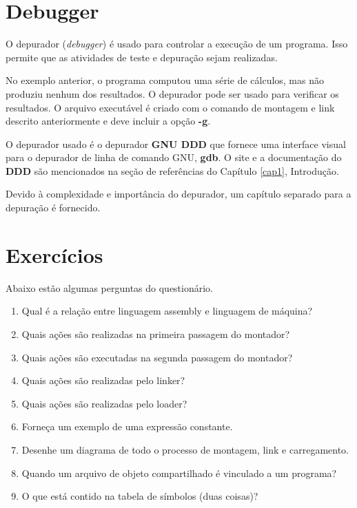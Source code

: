 \section{Debugger}
O depurador (\textit{debugger}) é usado para controlar a execução de um programa. Isso permite que as atividades de teste e depuração sejam realizadas.

No exemplo anterior, o programa computou uma série de cálculos, mas não produziu nenhum dos resultados. O depurador pode ser usado para verificar os resultados. O arquivo executável é criado com o comando de montagem e link descrito anteriormente e deve incluir a opção \textbf{-g}.

O depurador usado é o depurador \textbf{GNU DDD} que fornece uma interface visual para o depurador de linha de comando GNU, \textbf{gdb}. O site e a documentação do \textbf{DDD} são mencionados na seção de referências do Capítulo \ref{cap1}, Introdução.

Devido à complexidade e importância do depurador, um capítulo separado para a depuração é fornecido.

\section{Exercícios}
Abaixo estão algumas perguntas do questionário.
\begin{enumerate}
	\item Qual é a relação entre linguagem assembly e linguagem de máquina?
	\item Quais ações são realizadas na primeira passagem do montador?
	\item Quais ações são executadas na segunda passagem do montador?
	\item Quais ações são realizadas pelo linker?
	\item Quais ações são realizadas pelo loader?
	\item Forneça um exemplo de uma expressão constante.
	\item Desenhe um diagrama de todo o processo de montagem, link e carregamento.
	\item Quando um arquivo de objeto compartilhado é vinculado a um programa?
	\item O que está contido na tabela de símbolos (duas coisas)?
\end{enumerate}

